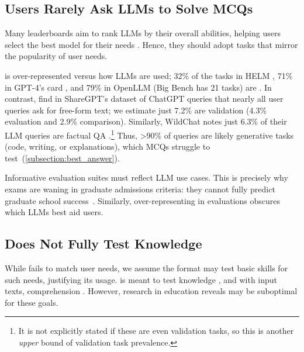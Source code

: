 \subsection{Users Rarely Ask LLMs to Solve MCQs} \label{subsection:use_cases}

Many leaderboards aim to rank LLMs by their overall abilities, helping users select the best model for their needs \cite{xia2024top}.
Hence, they should adopt tasks that mirror the popularity of user needs.

\mcqa is over-represented versus how LLMs are used; 32\% of the tasks in HELM
\cite{perlitz2023efficient}, 71\% in GPT-4's card \cite{achiam2023gpt}, and 79\% in OpenLLM (Big Bench has 21 \mcqa tasks) \cite{open-llm-leaderboard-v2} are \mcqa.
%
In contrast, \citet{ouyang2023shifted} find in ShareGPT's dataset of ChatGPT queries that nearly all user queries
ask for free-form text; we estimate just 7.2\% are validation (4.3\% evaluation and 2.9\% comparison).
%
Similarly, WildChat notes just 6.3\% of their LLM queries are factual QA \cite{zhao2024wildchat}.\footnote{It is not explicitly stated if these are even validation tasks, so this is another \textit{upper} bound of validation task prevalence.}
Thus, >90\% of queries are likely generative tasks (code, writing, or explanations), which MCQs struggle to test~(\cref{subsection:best_answer}).


Informative evaluation suites must reflect LLM use cases.
%
This is precisely why \mcqa exams are waning in graduate admissions
criteria: they cannot fully predict graduate school
success~\cite{sampson2001gre}. 
%
Similarly, over-representing \mcqa in evaluations obscures which LLMs best aid users.

\subsection{\mcqa Does Not Fully Test Knowledge} \label{subsection:testing_what}

While \mcqa fails to match user needs, we assume the format may test basic skills for such needs, justifying its usage.
%
\mcqa is meant to test knowledge \cite{moss2001multiple}, and with input texts, comprehension \cite{farr1990description}.
%
However, research in education reveals \mcqa may be suboptimal for these goals.

